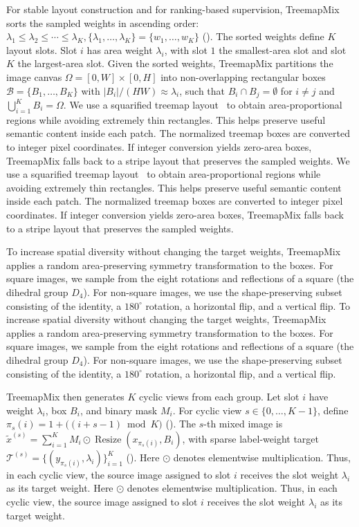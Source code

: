For stable layout construction and for ranking-based supervision, TreemapMix sorts the sampled weights in ascending order: \label{eq:ascending-weights}\(\lambda_1\le\lambda_2\le\cdots\le\lambda_K,\{\lambda_1,\dots,\lambda_K\}=\{w_1,\dots,w_K\}\)\textup{ (\theequation)}.
The sorted weights define $K$ layout slots. Slot $i$ has area weight $\lambda_i$, with slot $1$ the smallest-area slot and slot $K$ the largest-area slot.
Given the sorted weights, TreemapMix partitions the image canvas $\Omega=[0,W]\times[0,H]$ into non-overlapping rectangular boxes \(\mathcal{B}=\{B_1,\dots,B_K\}\) with \(|B_i|/(HW)\approx \lambda_i\), such that \(B_i\cap B_j=\emptyset\) for \(i\neq j\) and \(\bigcup_{i=1}^{K}B_i=\Omega\).
We use a squarified treemap layout~\cite{squarifiedtreemap} to obtain area-proportional regions while avoiding extremely thin rectangles. This helps preserve useful semantic content inside each patch. The normalized treemap boxes are converted to integer pixel coordinates. If integer conversion yields zero-area boxes, TreemapMix falls back to a stripe layout that preserves the sampled weights.
We use a squarified treemap layout~\cite{squarifiedtreemap} to obtain area-proportional regions while avoiding extremely thin rectangles. This helps preserve useful semantic content inside each patch. The normalized treemap boxes are converted to integer pixel coordinates. If integer conversion yields zero-area boxes, TreemapMix falls back to a stripe layout that preserves the sampled weights.

To increase spatial diversity without changing the target weights, TreemapMix applies a random area-preserving symmetry transformation to the boxes. For square images, we sample from the eight rotations and reflections of a square (the dihedral group $D_4$). For non-square images, we use the shape-preserving subset consisting of the identity, a $180^\circ$ rotation, a horizontal flip, and a vertical flip.
To increase spatial diversity without changing the target weights, TreemapMix applies a random area-preserving symmetry transformation to the boxes. For square images, we sample from the eight rotations and reflections of a square (the dihedral group $D_4$). For non-square images, we use the shape-preserving subset consisting of the identity, a $180^\circ$ rotation, a horizontal flip, and a vertical flip.

TreemapMix then generates $K$ cyclic views from each group. Let slot $i$ have weight $\lambda_i$, box $B_i$, and binary mask $M_i$. For cyclic view $s\in\{0,\dots,K-1\}$, define \label{eq:cyclic-map}\(\pi_s(i)=1+\bigl((i+s-1)\bmod K\bigr)\)\textup{ (\theequation)}. The $s$-th mixed image is \(\tilde{x}^{(s)}=\sum_{i=1}^{K} M_i\odot \operatorname{Resize}(x_{\pi_s(i)},B_i)\), with sparse label-weight target \label{eq:cyclic-target}\(\mathcal{T}^{(s)}=\{(y_{\pi_s(i)},\lambda_i)\}_{i=1}^{K}\)\textup{ (\theequation)}.
Here $\odot$ denotes elementwise multiplication. Thus, in each cyclic view, the source image assigned to slot $i$ receives the slot weight $\lambda_i$ as its target weight.
Here $\odot$ denotes elementwise multiplication. Thus, in each cyclic view, the source image assigned to slot $i$ receives the slot weight $\lambda_i$ as its target weight.

